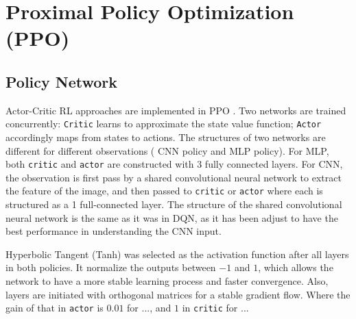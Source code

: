 \documentclass{article}
\begin{document}
\section{Proximal Policy Optimization (PPO)}




\subsection{Policy Network}
Actor-Critic RL approaches are implemented in PPO \cite{konda_actor-critic_1999}. Two networks are trained concurrently: \texttt{Critic} learns to approximate the state value function; \texttt{Actor} accordingly maps from states to actions. The structures of two networks are different for different observations ( CNN policy and MLP policy). For MLP, both \texttt{critic} and \texttt{actor} are constructed with 3 fully connected layers. For CNN, the observation is first pass by a shared convolutional neural network to extract the feature of the image, and then passed to \texttt{critic} or \texttt{actor} where each is structured as a 1 full-connected layer. The structure of the shared convolutional neural network is the same as it was in DQN, as it has been adjust to have the best performance in understanding the CNN input. 

Hyperbolic Tangent (Tanh) was selected as the activation function after all layers in both policies. It normalize the outputs between $-1$ and $1$, which allows the network to have a more stable learning process and faster convergence. Also, layers are initiated  with orthogonal matrices for a stable gradient flow. Where the gain of that in \texttt{actor} is $0.01$ for ..., and $1$ in \texttt{critic} for ...
\end{document}
